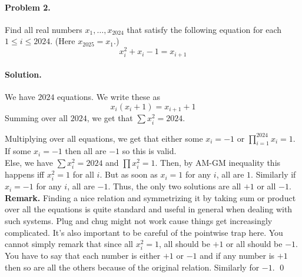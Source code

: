 \documentclass[12pt]{article}
\newenvironment{solution}
{\paragraph{Solution.}}
{\qed\eject}
\begin{document}
\paragraph{\textbf{Problem 2.}} Find all real numbers $x_1, \dots, x_{2024}$ that satisfy the following equation for each $1 \le i \le 2024$. (Here $x_{2025} = x_1$.)
\[ x_i^2 + x_i - 1 = x_{i+1} \]
\begin{solution}
    We have $2024$ equations. We write these as \[x_i(x_i+1)=x_{i+1}+1\]
    Summing over all $2024$, we get that $\sum x_i^2=2024$.

    Multiplying over all equations, we get that either some $x_i=-1$ or $\prod\limits_{i=1}^{2024} x_i=1$. If some $x_i=-1$ then all are $-1$ so this is valid.\\

    Else, we have $\sum x_i^2=2024$ and $\prod x_i^2=1$. Then, by AM-GM inequality this happens iff $x_i^2=1$ for all $i$. But as soon as $x_i=1$ for any $i$, all are $1$. Similarly if $x_i=-1$ for any $i$, all are $-1$. Thus, the only two solutions are all $+1$ or all $-1$.\\

    \textbf{Remark.} Finding a nice relation and symmetrizing it by taking sum or product over all the equations is quite standard and useful in general when dealing with such systems. Plug and chug might not work cause things get increasingly complicated. It's also important to be careful of the pointwise trap here. You cannot simply remark that since all $x_i^2=1$, all should be $+1$ or all should be $-1$. You have to say that each number is either $+1$ or $-1$ and if any number is $+1$ then so are all the others because of the original relation. Similarly for $-1$.
\end{solution}
\end{document}
